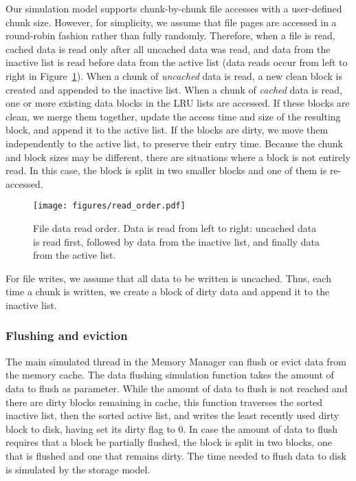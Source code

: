 \documentclass[conference]{IEEEtran}
\begin{document}
    Our simulation model supports chunk-by-chunk file accesses
    with a user-defined chunk size. However, for simplicity, we assume that file pages are
    accessed in a round-robin fashion rather than fully randomly.
    Therefore, when a file is read, cached data is read only after all uncached data was read, and data from the inactive list is read
    before data from the active list
    (data reads occur from left to right in Figure~\ref{fig:read_order}).
    When a chunk of \emph{uncached} data is read, a new clean block is created
    and appended to the inactive list.
    When a chunk of \emph{cached} data is read, one or more existing data blocks in the LRU lists are accessed.
    If these blocks are clean, we merge them together, update the access time and size of the resulting block,
    and append it to the active list.
    If the blocks are dirty, we move them independently to the active list, to preserve their entry time.
    Because the chunk and block sizes may be different, there are situations
    where a block is not entirely read.
    In this case, the block is split in two smaller blocks and one of them is re-accessed.
    \begin{figure}
           \centering
           \texttt{[image: figures/read\_order.pdf]}
           \caption{File data read order. Data is read from left to right: uncached data
           is read first, followed by data from the inactive list, and finally data from the active list. }
           \label{fig:read_order}
    \end{figure}

    For file writes, we assume that all data to be written is
    uncached. Thus, each time a chunk is written, we create a block of dirty data
    and append it to the inactive list.

    \subsubsection{Flushing and eviction}

    The main simulated thread in the Memory Manager can flush or evict data from the
    memory cache. The data flushing simulation
    function takes the amount of data to flush as parameter. While
    the amount of data to flush is not reached and there are dirty
    blocks remaining in cache, this function traverses the sorted
    inactive list, then the sorted active list, and writes the
    least recently used dirty block to disk, having set its dirty
    flag to 0. In case the amount of data to flush requires that a
    block be partially flushed, the block is split in two blocks,
    one that is flushed and one that remains dirty. The time needed
    to flush data to disk is simulated by the storage model.
\end{document}
